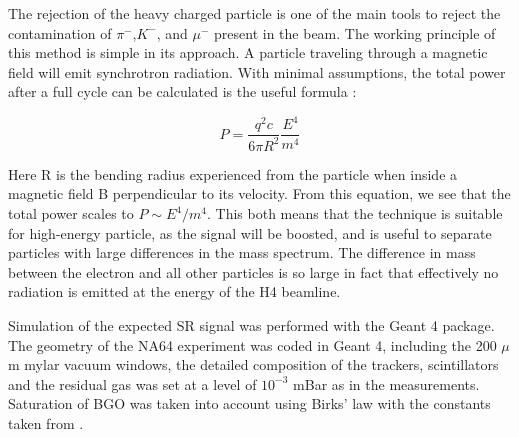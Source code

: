 The rejection of the heavy charged particle is one of the main tools to reject the contamination of $\pi^-$,$K^-$, and $\mu^-$ present in the beam. The working principle of this method is simple in its approach. A particle traveling through a magnetic field will emit synchrotron radiation. With minimal assumptions, the total power after a full cycle can be calculated is the useful formula :

\begin{equation}
  \label{eq:srd-power}
  P = \frac{q^2 c}{6 \pi R^2}\frac{E^4}{m^4}
\end{equation}

Here R is the bending radius experienced from the particle when inside a magnetic field B perpendicular to its velocity. From this equation, we see that the total power scales to $P\sim E^4/m^4$. This both means that the technique is suitable for high-energy particle, as the signal will be boosted, and is useful to separate particles with large differences in the mass spectrum. The difference in mass between the electron and all other particles is so large in fact that effectively no radiation is emitted at the energy of the H4 beamline. 

Simulation of the expected SR signal was performed with the Geant 4 package\cite{ALLISON2016186,1610988,AGOSTINELLI2003250}.
The geometry of the NA64 experiment was coded in Geant 4, including the 200 $\mu$m mylar vacuum windows, the detailed composition of the trackers, scintillators and the residual gas was set at a level of $10^{-3}$ mBar as in the measurements. Saturation of BGO was taken into account using Birks' law with the constants taken from \cite{AVDEICHIKOV2002251}.

